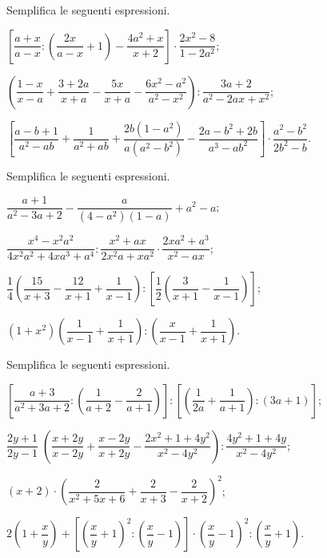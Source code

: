 \begin{esercizio}[\Ast]
\label{ese:14.56}
Semplifica le seguenti espressioni.
\begin{enumeratea}
 \item $\left[\dfrac{a+x}{a-x}:\left(\dfrac{2x}{a-x}+1\right)-\dfrac{4a^{2}+x}{x+2}\right]\cdot {\dfrac{2x^{2}-8}{1-2a^{2}}}$;
 \item $\left(\dfrac{1-x}{x-a}+\dfrac{3+2a}{x+a}-\dfrac{5x}{x+a}-\dfrac{6x^{2}-a^{2}}{a^{2}-x^{2}}\right):\dfrac{3a+2}{a^{2}-2ax+x^{2}}$;
 \item $\left[\dfrac{a-b+1}{a^{2}-ab}+\dfrac{1}{a^{2}+ab}+\dfrac{2b\left(1-a^{2}\right)}{a\left(a^{2}-b^{2}\right)}-\dfrac{2a-b^2+2b}{a^{3}-ab^{2}}\right]\cdot {\dfrac{a^{2}-b^{2}}{2b^{2}-b}}$.
\end{enumeratea}
\end{esercizio}

\begin{esercizio}[\Ast]
\label{ese:14.57}
Semplifica le seguenti espressioni.
\begin{enumeratea}
 \item $\dfrac{a+1}{a^{2}-3a+2}-\dfrac{a}{(4-a^{2})(1-a)}+a^{2}-a$;
 \item $\dfrac{x^{4}-x^{2}a^{2}}{4x^{2}a^{2}+4xa^{3}+a^{4}}:\dfrac{x^{2}+ax}{2x^{2}a+xa^{2}}\cdot {\dfrac{2xa^{2}+a^{3}}{x^{2}-ax}}$;
 \item $\dfrac{1}{4}\left(\dfrac{15}{x+3}-\dfrac{12}{x+1}+\dfrac{1}{x-1}\right):\left[\dfrac{1}{2}\left(\dfrac{3}{x+1}-\dfrac{1}{x-1}\right)\right]$;
 \item $\left(1+x^{2}\right)\left(\dfrac{1}{x-1}+\dfrac{1}{x+1}\right):\left(\dfrac{x}{x-1}+\dfrac{1}{x+1}\right)$.
\end{enumeratea}
\end{esercizio}

\begin{esercizio}[\Ast]
\label{ese:14.58}
Semplifica le seguenti espressioni.
\begin{enumeratea}
 \item $\left[\dfrac{a+3}{a^{2}+3a+2}:\left(\dfrac{1}{a+2}-\dfrac{2}{a+1}\right)\right]:\left[\left(\dfrac{1}{2a}+\dfrac{1}{a+1}\right):(3a+1)\right]$;
 \item $\dfrac{2y+1}{2y-1}\;\left(\dfrac{x+2y}{x-2y}+\dfrac{x-2y}{x+2y}-\dfrac{2x^{2}+1+4y^{2}}{x^{2}-4y^{2}}\right):\dfrac{4y^{2}+1+4y}{x^{2}-4y^{2}}$;
 \item $(x+2)\cdot \left(\dfrac{2}{x^{2}+5x+6}+\dfrac{2}{x+3}-\dfrac{2}{x+2}\right)^{2}$;
 \item $2\left(1+\dfrac{x}{y}\right)+\left[\left(\dfrac{x}{y}+1\right)^{2}:\left(\dfrac{x}{y}-1\right)\right]\cdot \left(\dfrac{x}{y}-1\right)^{2}:\left(\dfrac{x}{y}+1\right)$.
\end{enumeratea}
\end{esercizio}
\pagebreak


